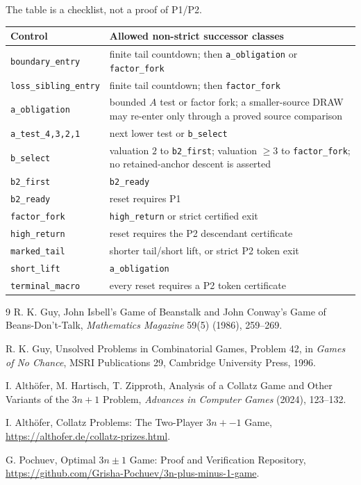 \documentclass[11pt]{article}
\begin{document}
The table is a checklist, not a proof of P1/P2.
\begin{center}
\small
\begin{tabular}{@{}p{.25\linewidth}p{.61\linewidth}@{}}
\toprule
Control & Allowed non-strict successor classes \\
\midrule
\texttt{boundary\_entry} & finite tail countdown; then
  \texttt{a\_obligation} or \texttt{factor\_fork} \\
\texttt{loss\_sibling\_entry} & finite tail countdown; then
  \texttt{factor\_fork} \\
\texttt{a\_obligation} & bounded $A$ test or factor fork; a smaller-source
  DRAW may re-enter only through a proved source comparison \\
\texttt{a\_test\_4,3,2,1} & next lower test or \texttt{b\_select} \\
\texttt{b\_select} & valuation $2$ to \texttt{b2\_first}; valuation
  $\ge3$ to \texttt{factor\_fork}; no retained-anchor descent is asserted \\
\texttt{b2\_first} & \texttt{b2\_ready} \\
\texttt{b2\_ready} & reset requires P1 \\
\texttt{factor\_fork} & \texttt{high\_return} or strict certified exit \\
\texttt{high\_return} & reset requires the P2 descendant certificate \\
\texttt{marked\_tail} & shorter tail/short lift, or strict P2 token exit \\
\texttt{short\_lift} & \texttt{a\_obligation} \\
\texttt{terminal\_macro} & every reset requires a P2 token certificate \\
\bottomrule
\end{tabular}
\end{center}

\begin{thebibliography}{9}
R. K. Guy, John Isbell's Game of Beanstalk and John Conway's Game of
Beans-Don't-Talk, \emph{Mathematics Magazine} 59(5) (1986), 259--269.

R. K. Guy, Unsolved Problems in Combinatorial Games, Problem 42, in
\emph{Games of No Chance}, MSRI Publications 29, Cambridge University Press,
1996.

I. Alth\"ofer, M. Hartisch, T. Zipproth, Analysis of a Collatz Game and Other
Variants of the $3n+1$ Problem, \emph{Advances in Computer Games} (2024),
123--132.

I. Alth\"ofer, Collatz Problems: The Two-Player $3n+-1$ Game,
\url{https://althofer.de/collatz-prizes.html}.

G. Pochuev, Optimal $3n\pm1$ Game: Proof and Verification Repository,
\url{https://github.com/Grisha-Pochuev/3n-plus-minus-1-game}.
\end{thebibliography}
\end{document}
